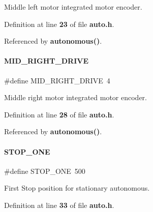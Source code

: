 Middle left motor integrated motor encoder. 



Definition at line \textbf{ 23} of file \textbf{ auto.\+h}.



Referenced by \textbf{ autonomous()}.

\mbox{\label{auto_8h_a2919b1b6b7bf06fab5b5bbf09d8d2761}} 
\paragraph{M\+I\+D\+\_\+\+R\+I\+G\+H\+T\+\_\+\+D\+R\+I\+VE}
{\footnotesize\ttfamily \#define M\+I\+D\+\_\+\+R\+I\+G\+H\+T\+\_\+\+D\+R\+I\+VE~4}



Middle right motor integrated motor encoder. 



Definition at line \textbf{ 28} of file \textbf{ auto.\+h}.



Referenced by \textbf{ autonomous()}.

\mbox{\label{auto_8h_a67c9207ce99d4414dce28d8c42ba1d2a}} 
\paragraph{S\+T\+O\+P\+\_\+\+O\+NE}
{\footnotesize\ttfamily \#define S\+T\+O\+P\+\_\+\+O\+NE~500}



First Stop position for stationary autonomous. 



Definition at line \textbf{ 33} of file \textbf{ auto.\+h}.

